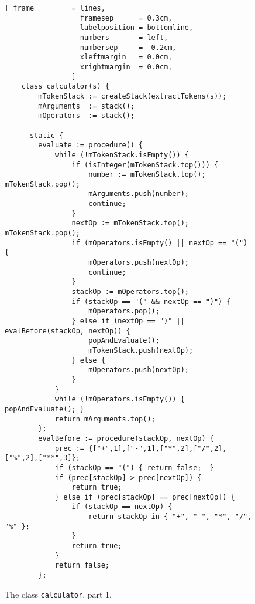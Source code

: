 \begin{figure}[!b]
  \centering
\begin{Verbatim}[ frame         = lines, 
                  framesep      = 0.3cm, 
                  labelposition = bottomline,
                  numbers       = left,
                  numbersep     = -0.2cm,
                  xleftmargin   = 0.0cm,
                  xrightmargin  = 0.0cm,
                ]
    class calculator(s) {
        mTokenStack := createStack(extractTokens(s));
        mArguments  := stack();
        mOperators  := stack();
    
      static {
        evaluate := procedure() {
            while (!mTokenStack.isEmpty()) {
                if (isInteger(mTokenStack.top())) {
                    number := mTokenStack.top(); mTokenStack.pop();
                    mArguments.push(number);
                    continue;
                } 
                nextOp := mTokenStack.top(); mTokenStack.pop();
                if (mOperators.isEmpty() || nextOp == "(") {
                    mOperators.push(nextOp);
                    continue;
                }
                stackOp := mOperators.top();
                if (stackOp == "(" && nextOp == ")") {
                    mOperators.pop();
                } else if (nextOp == ")" || evalBefore(stackOp, nextOp)) {
                    popAndEvaluate();
                    mTokenStack.push(nextOp);
                } else {
                    mOperators.push(nextOp);
                }
            }
            while (!mOperators.isEmpty()) { popAndEvaluate(); }
            return mArguments.top();
        };
        evalBefore := procedure(stackOp, nextOp) {
            prec := {["+",1],["-",1],["*",2],["/",2],["%",2],["**",3]};
            if (stackOp == "(") { return false;  }
            if (prec[stackOp] > prec[nextOp]) {
                return true;
            } else if (prec[stackOp] == prec[nextOp]) {
                if (stackOp == nextOp) {
                    return stackOp in { "+", "-", "*", "/", "%" };
                }
                return true;
            } 
            return false;
        };
\end{Verbatim}
\vspace*{-0.3cm}
  \caption{The class \texttt{calculator}, part 1.}
  \label{fig:calculator.setlx-1}
\end{figure} 

